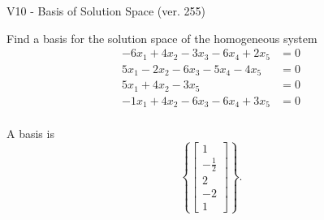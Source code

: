 \begin{exercise}
  \begin{exerciseTitle}V10 - Basis of Solution Space (ver. 255)\end{exerciseTitle}
  \begin{exerciseStatement}
    Find a basis for the solution space of the homogeneous system 
\begin{align*}
 -6 x_ 1 + 4 x_ 2 -3 x_ 3 -6 x_ 4 + 2 x_ 5 &= 0  \\ 
  5 x_ 1 -2 x_ 2 -6 x_ 3 -5 x_ 4 -4 x_ 5 &= 0  \\ 
  5 x_ 1 + 4 x_ 2 -3 x_ 5 &= 0  \\ 
  -1 x_ 1 + 4 x_ 2 -6 x_ 3 -6 x_ 4 + 3 x_ 5 &= 0  \\ 
 \end{align*}


 
  \end{exerciseStatement}

  \begin{exerciseAnswer}
   A basis is   
\[\left\{\left[\begin{array}{c}
1 \\
-\frac{1}{2} \\
2 \\
-2 \\
1
\end{array}\right]\right\}.\]

  


  \end{exerciseAnswer}
\end{exercise}